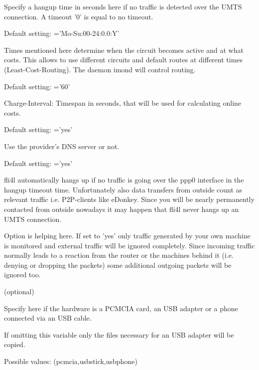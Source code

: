 \begin{description}
	Specify a hangup time in seconds here if no traffic is detected 
	over the UMTS connection. A timeout '0' is equal to no timeout.


	Default setting:  ='Mo-Su:00-24:0.0:Y'

	Times mentioned here determine when the circuit becomes active and 
	at what costs. This allows to use different circuits and default routes 
	at different times (Least-Cost-Routing). The daemon imond will 
	control	routing.


	Default setting:  ='60'

	Charge-Interval: Timespan in seconds, that will be used 
	for calculating online costs.


	Default setting:  ='yes'

	Use the provider's DNS server or not.


	Default setting:  ='yes'

	fli4l automatically hangs up if no traffic is going over the ppp0 
	interface in the hangup timeout time. Unfortunately also data transfers 
	from outside count as relevant traffic i.e. P2P-clients like eDonkey. 
	Since you will be nearly permanently contacted from outside nowadays 
	it may happen that fli4l never hangs up an UMTS connection. 

	Option  is helping here. If set to 'yes' only traffic 
	generated by your own machine is monitored and external traffic will be 
	ignored completely. Since incoming traffic normally leads to a reaction 
	from the router or the machines behind it (i.e. denying or dropping the 
	packets) some additional outgoing packets will be ignored too.



	(optional)

	Specify here if the hardware is a PCMCIA card, an USB adapter or 
	a phone connected via an USB cable.

	If omitting this variable only the files necessary for an USB 
	adapter will be copied.

	Possible values: (pcmcia,usbstick,usbphone)


\end{description}
